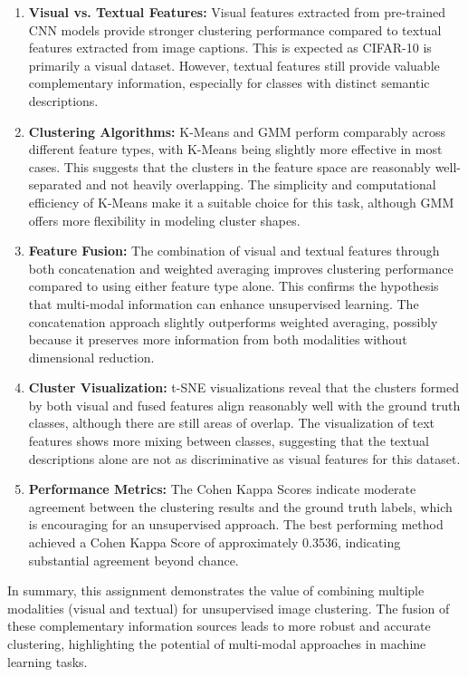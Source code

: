\documentclass[12pt]{article}
\begin{document}
\begin{enumerate}
    \item \textbf{Visual vs. Textual Features:} Visual features extracted from pre-trained CNN models provide stronger clustering performance compared to textual features extracted from image captions. This is expected as CIFAR-10 is primarily a visual dataset. However, textual features still provide valuable complementary information, especially for classes with distinct semantic descriptions.
    
    \item \textbf{Clustering Algorithms:} K-Means and GMM perform comparably across different feature types, with K-Means being slightly more effective in most cases. This suggests that the clusters in the feature space are reasonably well-separated and not heavily overlapping. The simplicity and computational efficiency of K-Means make it a suitable choice for this task, although GMM offers more flexibility in modeling cluster shapes.
    
    \item \textbf{Feature Fusion:} The combination of visual and textual features through both concatenation and weighted averaging improves clustering performance compared to using either feature type alone. This confirms the hypothesis that multi-modal information can enhance unsupervised learning. The concatenation approach slightly outperforms weighted averaging, possibly because it preserves more information from both modalities without dimensional reduction.
    
    \item \textbf{Cluster Visualization:} t-SNE visualizations reveal that the clusters formed by both visual and fused features align reasonably well with the ground truth classes, although there are still areas of overlap. The visualization of text features shows more mixing between classes, suggesting that the textual descriptions alone are not as discriminative as visual features for this dataset.
    
    \item \textbf{Performance Metrics:} The Cohen Kappa Scores indicate moderate agreement between the clustering results and the ground truth labels, which is encouraging for an unsupervised approach. The best performing method achieved a Cohen Kappa Score of approximately 0.3536, indicating substantial agreement beyond chance.
\end{enumerate}

In summary, this assignment demonstrates the value of combining multiple modalities (visual and textual) for unsupervised image clustering. The fusion of these complementary information sources leads to more robust and accurate clustering, highlighting the potential of multi-modal approaches in machine learning tasks.
\end{document}
